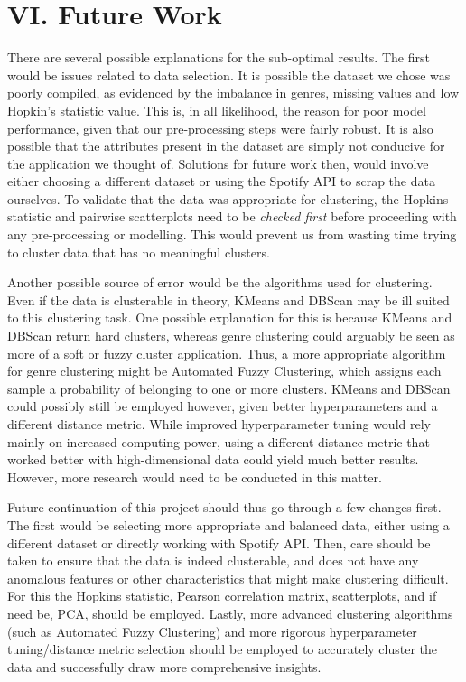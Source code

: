 \documentclass[conference]{IEEEtran}
\begin{document}
\section*{VI. Future Work}
There are several possible explanations for the sub-optimal results.  The first would be issues related to data selection. It is possible the dataset we chose was poorly compiled, as evidenced by the imbalance in genres, missing values and low Hopkin's statistic value. This is, in all likelihood, the reason for poor model performance, given that our pre-processing steps were fairly robust. It is also possible that the attributes present in the dataset are simply not conducive for the application we thought of. Solutions for future work then, would involve either choosing a different dataset or using the Spotify API to scrap the data ourselves.  To validate that the data was appropriate for clustering, the Hopkins statistic and pairwise scatterplots need to be \textit{checked first} before proceeding with any pre-processing or modelling. This would prevent us from wasting time trying to cluster data that has no meaningful clusters.

Another possible source of error would be the algorithms used for clustering. Even if the data is clusterable in theory, KMeans and DBScan may be ill suited to this clustering task. One possible explanation for this is because KMeans and DBScan return hard clusters, whereas genre clustering could arguably be seen as more of a soft or fuzzy cluster application. Thus, a more appropriate algorithm for genre clustering might be Automated Fuzzy Clustering, which assigns each sample a probability of belonging to one or more clusters. KMeans and DBScan could possibly still be employed however, given better hyperparameters and a different distance metric. While improved hyperparameter tuning would rely mainly on increased computing power, using a different distance metric that worked better with high-dimensional data could yield much better results. However, more research would need to be conducted in this matter.

Future continuation of this project should thus go through a few changes first.  The first would be selecting more appropriate and balanced data, either using a different dataset or directly working with Spotify API. Then, care should be taken to ensure that the data is indeed clusterable, and does not have any anomalous features or other characteristics that might make clustering difficult. For this the Hopkins statistic, Pearson correlation matrix, scatterplots, and if need be, PCA, should be employed. Lastly, more advanced clustering algorithms (such as Automated Fuzzy Clustering) and more rigorous hyperparameter tuning/distance metric selection should be employed to accurately cluster the data and successfully draw more comprehensive insights.
\end{document}
